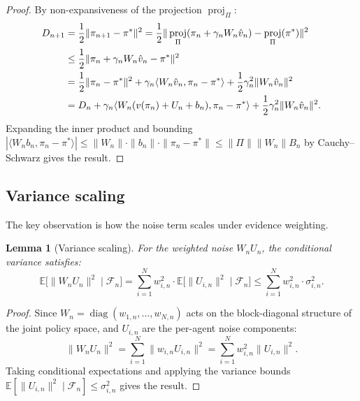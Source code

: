 \documentclass[11pt,a4paper]{article}
\newtheorem{lemma}[theorem]{Lemma}
\DeclareMathOperator{\proj}{proj}
\DeclareMathOperator{\diag}{diag}
\newcommand{\E}{\mathbb{E}}
\newcommand{\cF}{\mathcal{F}}
\newcommand{\ip}[2]{\langle #1, #2 \rangle}
\begin{document}
\begin{proof}
By non-expansiveness of the projection $\proj_\Pi$:
\begin{align}
    D_{n+1} &= \frac{1}{2}\|\pi_{n+1} - \pi^*\|^2
    = \frac{1}{2}\|\proj_\Pi(\pi_n + \gamma_n W_n \hat{v}_n) - \proj_\Pi(\pi^*)\|^2 \notag\\
    &\leq \frac{1}{2}\|\pi_n + \gamma_n W_n \hat{v}_n - \pi^*\|^2 \notag\\
    &= \frac{1}{2}\|\pi_n - \pi^*\|^2 + \gamma_n \ip{W_n \hat{v}_n}{\pi_n - \pi^*} + \frac{1}{2}\gamma_n^2 \|W_n \hat{v}_n\|^2 \notag\\
    &= D_n + \gamma_n \ip{W_n(v(\pi_n) + U_n + b_n)}{\pi_n - \pi^*} + \frac{1}{2}\gamma_n^2 \|W_n \hat{v}_n\|^2. \label{eq:energy-expand}
\end{align}
Expanding the inner product and bounding $|\ip{W_n b_n}{\pi_n - \pi^*}| \leq \|W_n\| \cdot \|b_n\| \cdot \|\pi_n - \pi^*\| \leq \|\Pi\| \|W_n\| B_n$ by Cauchy--Schwarz gives the result.
\end{proof}

\subsection{Variance scaling}

The key observation is how the noise term scales under evidence weighting.

\begin{lemma}[Variance scaling]
\label{lem:variance-scaling}
For the weighted noise $W_n U_n$, the conditional variance satisfies:
\begin{equation}
\label{eq:var-scaling}
    \E\bigl[\|W_n U_n\|^2 \mid \cF_n\bigr] = \sum_{i=1}^N w_{i,n}^2 \cdot \E\bigl[\|U_{i,n}\|^2 \mid \cF_n\bigr] \leq \sum_{i=1}^N w_{i,n}^2 \cdot \sigma_{i,n}^2.
\end{equation}
\end{lemma}

\begin{proof}
Since $W_n = \diag(w_{1,n}, \ldots, w_{N,n})$ acts on the block-diagonal structure of the joint policy space, and $U_{i,n}$ are the per-agent noise components:
\[
    \|W_n U_n\|^2 = \sum_{i=1}^N \|w_{i,n} U_{i,n}\|^2 = \sum_{i=1}^N w_{i,n}^2 \|U_{i,n}\|^2.
\]
Taking conditional expectations and applying the variance bounds $\E[\|U_{i,n}\|^2 \mid \cF_n] \leq \sigma_{i,n}^2$ gives the result.
\end{proof}


\end{document}
